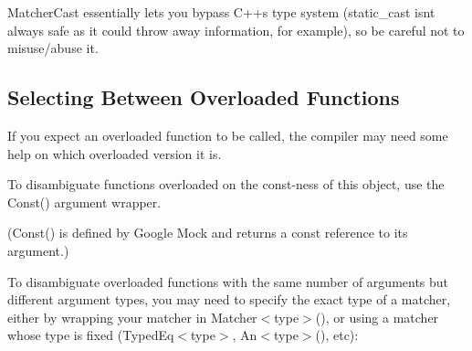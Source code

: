{\ttfamily Matcher\+Cast} essentially lets you bypass C++\textquotesingle{}s type system ({\ttfamily static\+\_\+cast} isn\textquotesingle{}t always safe as it could throw away information, for example), so be careful not to misuse/abuse it.

\subsection*{Selecting Between Overloaded Functions}

If you expect an overloaded function to be called, the compiler may need some help on which overloaded version it is.

To disambiguate functions overloaded on the const-\/ness of this object, use the {\ttfamily Const()} argument wrapper.


\begin{DoxyCode}{0}
\DoxyCodeLine{}
\DoxyCodeLine{\};}
\DoxyCodeLine{}
\end{DoxyCode}


({\ttfamily Const()} is defined by Google Mock and returns a {\ttfamily const} reference to its argument.)

To disambiguate overloaded functions with the same number of arguments but different argument types, you may need to specify the exact type of a matcher, either by wrapping your matcher in {\ttfamily Matcher$<$type$>$()}, or using a matcher whose type is fixed ({\ttfamily Typed\+Eq$<$type$>$}, {\ttfamily An$<$type$>$()}, etc)\+:


\begin{DoxyCode}{0}
\DoxyCodeLine{}
\DoxyCodeLine{\};}
\DoxyCodeLine{}
\DoxyCodeLine{}
\DoxyCodeLine{}
\DoxyCodeLine{\}}
\end{DoxyCode}


